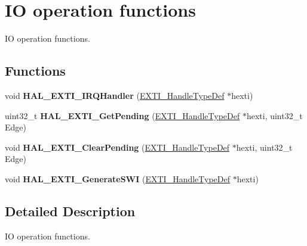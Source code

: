 \hypertarget{group___e_x_t_i___exported___functions___group2}{}\section{IO operation functions}
\label{group___e_x_t_i___exported___functions___group2}


IO operation functions.  


\subsection*{Functions}
\begin{DoxyCompactItemize}
\item 
\mbox{\label{group___e_x_t_i___exported___functions___group2_ga241422a810a8e2aeb0cd8467145d33bb}} 
void {\bfseries H\+A\+L\+\_\+\+E\+X\+T\+I\+\_\+\+I\+R\+Q\+Handler} (\mbox{\hyperlink{struct_e_x_t_i___handle_type_def}{E\+X\+T\+I\+\_\+\+Handle\+Type\+Def}} $\ast$hexti)
\item 
\mbox{\label{group___e_x_t_i___exported___functions___group2_ga96319c70ad567d85105e4608f8b0887e}} 
uint32\+\_\+t {\bfseries H\+A\+L\+\_\+\+E\+X\+T\+I\+\_\+\+Get\+Pending} (\mbox{\hyperlink{struct_e_x_t_i___handle_type_def}{E\+X\+T\+I\+\_\+\+Handle\+Type\+Def}} $\ast$hexti, uint32\+\_\+t Edge)
\item 
\mbox{\label{group___e_x_t_i___exported___functions___group2_gaa99dea85ad2aea36f0abbe022a82664d}} 
void {\bfseries H\+A\+L\+\_\+\+E\+X\+T\+I\+\_\+\+Clear\+Pending} (\mbox{\hyperlink{struct_e_x_t_i___handle_type_def}{E\+X\+T\+I\+\_\+\+Handle\+Type\+Def}} $\ast$hexti, uint32\+\_\+t Edge)
\item 
\mbox{\label{group___e_x_t_i___exported___functions___group2_ga6deebffde84bc80fa9ff1b7faa38615a}} 
void {\bfseries H\+A\+L\+\_\+\+E\+X\+T\+I\+\_\+\+Generate\+S\+WI} (\mbox{\hyperlink{struct_e_x_t_i___handle_type_def}{E\+X\+T\+I\+\_\+\+Handle\+Type\+Def}} $\ast$hexti)
\end{DoxyCompactItemize}


\subsection{Detailed Description}
IO operation functions. 


